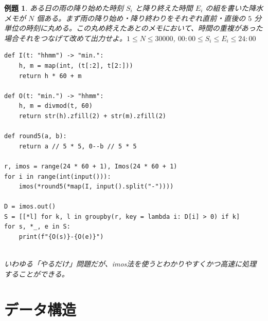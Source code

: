 \documentclass[12pt, a4j]{ltjsarticle}
\newtheorem{exm}[thm]{例題}
\begin{document}
\begin{exm} ある日の雨の降り始めた時刻 $S_i$ と降り終えた時間 $E_i$ の組を書いた降水メモが $N$ 個ある。まず雨の降り始め・降り終わりをそれぞれ直前・直後の $5$ 分単位の時刻に丸める。この丸め終えたあとのメモにおいて、時間の重複があった場合それをつなげて改めて出力せよ。$1\le N\le 30000$, $00:00\le S_i\le E_i \le 24:00$\\\upshape
\begin{lstlisting}
def I(t: "hhmm") -> "min.":
    h, m = map(int, (t[:2], t[2:]))
    return h * 60 + m

def O(t: "min.") -> "hhmm":
    h, m = divmod(t, 60)
    return str(h).zfill(2) + str(m).zfill(2)

def round5(a, b):
    return a // 5 * 5, 0--b // 5 * 5

r, imos = range(24 * 60 + 1), Imos(24 * 60 + 1)
for i in range(int(input())):
    imos(*round5(*map(I, input().split("-"))))

D = imos.out()
S = [[*l] for k, l in groupby(r, key = lambda i: D[i] > 0) if k]
for s, *_, e in S:
    print(f"{O(s)}-{O(e)}")
\end{lstlisting}\quad\\
いわゆる「やるだけ」問題だが、imos法を使うとわかりやすくかつ高速に処理することができる。
\end{exm}
\newpage
\section{データ構造}
\end{document}

